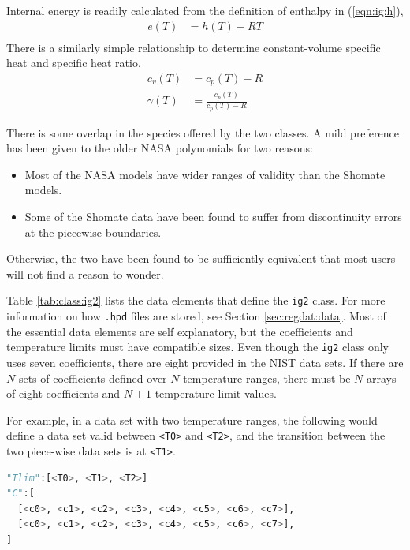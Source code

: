 Internal energy is readily calculated from the definition of enthalpy in (\ref{eqn:ig:h}),
\begin{align}
e(T) &= h(T) - RT\nonumber\\
\end{align}
There is a similarly simple relationship to determine constant-volume specific heat and specific heat ratio,
\begin{align}
c_v(T) &= c_p(T) - R\\
\gamma(T) &= \frac{c_p(T)}{c_p(T)-R}
\end{align}

There is some overlap in the species offered by the two classes.  A mild preference has been given to the older NASA polynomials for two reasons:
\begin{itemize}
\item Most of the NASA models have wider ranges of validity than the Shomate models.
\item Some of the Shomate data have been found to suffer from discontinuity errors at the piecewise boundaries.
\end{itemize}
Otherwise, the two have been found to be sufficiently equivalent that most users will not find a reason to wonder.

Table \ref{tab:class:ig2} lists the data elements that define the \texttt{ig2} class.  For more information on how \texttt{.hpd} files are stored, see Section \ref{sec:regdat:data}.  Most of the essential data elements are self explanatory, but the coefficients and temperature limits must have compatible sizes.  Even though the \texttt{ig2} class only uses seven coefficients, there are eight provided in the NIST data sets.  If there are $N$ sets of coefficients defined over $N$ temperature ranges, there must be $N$ arrays of eight coefficients and $N+1$ temperature limit values.

For example, in a data set with two temperature ranges, the following would define a data set valid between \texttt{<T0>} and \texttt{<T2>}, and the transition between the two piece-wise data sets is at \texttt{<T1>}.
\begin{lstlisting}[language=Python]
"Tlim":[<T0>, <T1>, <T2>]
"C":[
  [<c0>, <c1>, <c2>, <c3>, <c4>, <c5>, <c6>, <c7>],
  [<c0>, <c1>, <c2>, <c3>, <c4>, <c5>, <c6>, <c7>],
]
\end{lstlisting}

